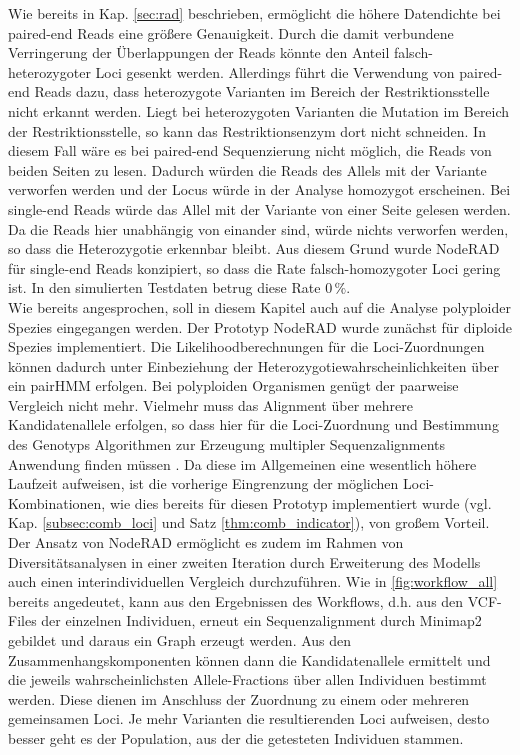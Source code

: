 Wie bereits in Kap. \ref{sec:rad} beschrieben, ermöglicht die höhere Datendichte bei paired-end Reads eine größere Genauigkeit. Durch die damit verbundene Verringerung der Überlappungen der Reads könnte den Anteil falsch-heterozygoter Loci gesenkt werden. Allerdings führt die Verwendung von paired-end Reads dazu, dass heterozygote Varianten im Bereich der Restriktionsstelle nicht erkannt werden. Liegt bei heterozygoten Varianten die Mutation im Bereich der Restriktionsstelle, so kann das Restriktionsenzym dort nicht schneiden. In diesem Fall wäre es bei paired-end Sequenzierung nicht möglich, die Reads von beiden Seiten zu lesen. Dadurch würden die Reads des Allels mit der Variante verworfen werden und der Locus würde in der Analyse homozygot erscheinen. Bei single-end Reads würde das Allel mit der Variante von einer Seite gelesen werden. Da die Reads hier unabhängig von einander sind, würde nichts verworfen werden, so dass die Heterozygotie erkennbar bleibt. Aus diesem Grund wurde NodeRAD für single-end Reads konzipiert, so dass die Rate falsch-homozygoter Loci gering ist. In den simulierten Testdaten betrug diese Rate $0 \, \%$. \\

Wie bereits angesprochen, soll in diesem Kapitel auch auf die Analyse polyploider Spezies eingegangen werden. Der Prototyp NodeRAD wurde zunächst für diploide Spezies implementiert. Die Likelihoodberechnungen für die Loci-Zuordnungen können dadurch unter Einbeziehung der Heterozygotiewahrscheinlichkeiten über ein pairHMM erfolgen. Bei polyploiden Organismen genügt der paarweise Vergleich nicht mehr. Vielmehr muss das Alignment über mehrere Kandidatenallele erfolgen, so dass hier für die Loci-Zuordnung und Bestimmung des Genotyps Algorithmen zur Erzeugung multipler Sequenzalignments Anwendung finden müssen \cite{chowdhury_2017,bawono_2017,chatzou_2015}. Da diese im Allgemeinen eine wesentlich höhere Laufzeit aufweisen, ist die vorherige Eingrenzung der möglichen Loci-Kombinationen, wie dies bereits für diesen Prototyp implementiert wurde (vgl. Kap. \ref{subsec:comb_loci} und Satz \ref{thm:comb_indicator}), von großem Vorteil. \\

Der Ansatz von NodeRAD ermöglicht es zudem im Rahmen von Diversitätsanalysen in einer zweiten Iteration durch Erweiterung des Modells auch einen interindividuellen Vergleich durchzuführen. Wie in \autoref{fig:workflow_all} bereits angedeutet, kann aus den Ergebnissen des Workflows, d.h. aus den VCF-Files der einzelnen Individuen, erneut ein Sequenzalignment durch Minimap2 gebildet und daraus ein Graph erzeugt werden. Aus den Zusammenhangskomponenten können dann die Kandidatenallele ermittelt und die jeweils wahrscheinlichsten Allele-Fractions über allen Individuen bestimmt werden. Diese dienen im Anschluss der Zuordnung zu einem oder mehreren gemeinsamen Loci. Je mehr Varianten die resultierenden Loci aufweisen, desto besser geht es der Population, aus der die getesteten Individuen stammen.\\

\let\cleardoublepage\clearpage